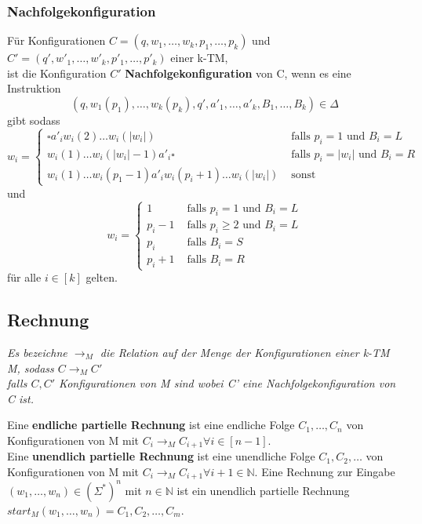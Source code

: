 \documentclass[DIV=15]{scrartcl}
\begin{document}
    \subsubsection{Nachfolgekonfiguration}
        Für Konfigurationen \(C=(q,w_1,\dots,w_k,p_1,\dots,p_k)\) und \(C'=(q',w'_1,\dots,w'_k,p'_1,\dots,p'_k)\) einer k-TM, \\
        ist die Konfiguration \(C'\) \textbf{Nachfolgekonfiguration} von C, wenn es eine Instruktion 
        \[(q,w_1(p_1),\dots,w_k(p_k),q',a'_1,\dots,a'_k,B_1,\dots,B_k)\in\Delta\] 
        gibt sodass
        \[
        w_i = \begin{cases}
            \square a'_iw_i(2)\dots w_i(|w_i|) & \text{ falls } p_i=1 \text{ und } B_i=L\\
            w_i(1)\dots w_i(|w_i|-1)a'_i\square & \text{ falls } p_i=|w_i| \text{ und } B_i = R\\
            w_i(1)\dots w_i(p_1-1)a'_iw_i(p_i+1)\dots w_i(|w_i|) & \text{ sonst}
        \end{cases}    
        \]
        und 
        \[
        w_i = \begin{cases}
            1 & \text{ falls } p_i=1 \text{ und } B_i=L\\
            p_i-1 & \text{ falls } p_i \geq 2 \text{ und } B_i = L\\
            p_i & \text{ falls } B_i=S\\
            p_i+1 & \text{ falls } B_i=R
        \end{cases}    
        \]
        für alle \(i\in [k]\) gelten.
    \subsection{Rechnung}
        \textit{Es bezeichne \(\to _M\) die Relation auf der Menge der Konfigurationen einer k-TM M, sodass \(C\to _M C'\) \\
        falls \(C,C'\) Konfigurationen von M sind wobei C' eine Nachfolgekonfiguration von C ist.} \par\bigskip
        Eine \textbf{endliche partielle Rechnung} ist eine endliche Folge \(C_1,\dots,C_n\) von Konfigurationen von 
        M mit \(C_i\to _M C_{i+1}\forall i\in[n-1]\).\\
        Eine \textbf{unendlich partielle Rechnung} ist eine unendliche Folge \(C_1,C_2,\dots\) von Konfigurationen von 
        M mit \(C_i\to _M C_{i+1}\forall i+1\in\mathbb{N}\).
        Eine Rechnung zur Eingabe \((w_1,\dots,w_n)\in(\Sigma^*)^n\) mit \(n\in \mathbb{N}\) ist ein 
        unendlich partielle Rechnung \(start_M(w_1,\dots,w_n)=C_1,C_2,\dots,C_m\).
\end{document}
